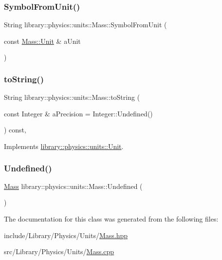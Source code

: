 \subsubsection{\texorpdfstring{Symbol\+From\+Unit()}{SymbolFromUnit()}}
{\footnotesize\ttfamily String library\+::physics\+::units\+::\+Mass\+::\+Symbol\+From\+Unit (\begin{DoxyParamCaption}\item[{const \hyperlink{classlibrary_1_1physics_1_1units_1_1_mass_a95f1e0434bc16794926b8e273bc2a54b}{Mass\+::\+Unit} \&}]{a\+Unit }\end{DoxyParamCaption})\hspace{0.3cm}{\ttfamily [static]}}

\mbox{\label{classlibrary_1_1physics_1_1units_1_1_mass_a6e7757920752ac9f6918525d6fadb31e}} 
\subsubsection{\texorpdfstring{to\+String()}{toString()}}
{\footnotesize\ttfamily String library\+::physics\+::units\+::\+Mass\+::to\+String (\begin{DoxyParamCaption}\item[{const Integer \&}]{a\+Precision = {\ttfamily Integer\+:\+:Undefined()} }\end{DoxyParamCaption}) const\hspace{0.3cm}{\ttfamily [override]}, {\ttfamily [virtual]}}



Implements \hyperlink{classlibrary_1_1physics_1_1units_1_1_unit_ad7364d457300e36413323c4aebce8029}{library\+::physics\+::units\+::\+Unit}.

\mbox{\label{classlibrary_1_1physics_1_1units_1_1_mass_af3acc8762e8791a218e877595e94090b}} 
\subsubsection{\texorpdfstring{Undefined()}{Undefined()}}
{\footnotesize\ttfamily \hyperlink{classlibrary_1_1physics_1_1units_1_1_mass}{Mass} library\+::physics\+::units\+::\+Mass\+::\+Undefined (\begin{DoxyParamCaption}{ }\end{DoxyParamCaption})\hspace{0.3cm}{\ttfamily [static]}}



The documentation for this class was generated from the following files\+:\begin{DoxyCompactItemize}
\item 
include/\+Library/\+Physics/\+Units/\hyperlink{_mass_8hpp}{Mass.\+hpp}\item 
src/\+Library/\+Physics/\+Units/\hyperlink{_mass_8cpp}{Mass.\+cpp}\end{DoxyCompactItemize}
